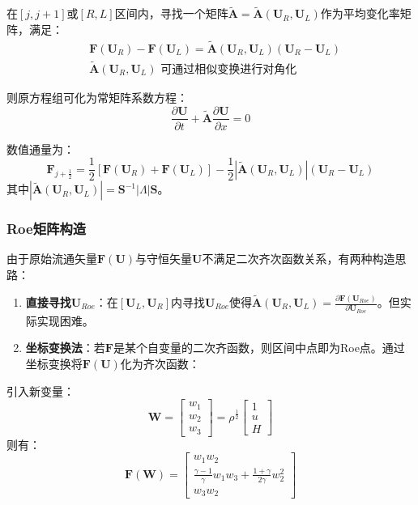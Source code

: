 \documentclass[12pt,a4paper]{article}
\begin{document}
在$[j,j+1]$或$[R,L]$区间内，寻找一个矩阵$\widetilde{\mathbf{A}} = \widetilde{\mathbf{A}}(\mathbf{U}_R, \mathbf{U}_L)$作为平均变化率矩阵，满足：
\begin{align*}
    &\mathbf{F}(\mathbf{U}_R) - \mathbf{F}(\mathbf{U}_L) = \widetilde{\mathbf{A}}(\mathbf{U}_R, \mathbf{U}_L)(\mathbf{U}_R - \mathbf{U}_L) \\
    &\widetilde{\mathbf{A}}(\mathbf{U}_R, \mathbf{U}_L) \text{ 可通过相似变换进行对角化}
\end{align*}

则原方程组可化为常矩阵系数方程：
$$
\frac{\partial \mathbf{U}}{\partial t} + \widetilde{\mathbf{A}}\frac{\partial \mathbf{U}}{\partial x} = 0
$$

数值通量为：
$$
\mathbf{F}_{j+\frac{1}{2}} = \frac{1}{2}\left[\mathbf{F}(\mathbf{U}_R) + \mathbf{F}(\mathbf{U}_L)\right] - \frac{1}{2}\left|\widetilde{\mathbf{A}}(\mathbf{U}_R, \mathbf{U}_L)\right|(\mathbf{U}_R - \mathbf{U}_L)
$$
其中$\left|\widetilde{\mathbf{A}}(\mathbf{U}_R, \mathbf{U}_L)\right| = \mathbf{S}^{-1}|\Lambda|\mathbf{S}$。

\subsubsection{Roe矩阵构造}
由于原始流通矢量$\mathbf{F}(\mathbf{U})$与守恒矢量$\mathbf{U}$不满足二次齐次函数关系，有两种构造思路：
\begin{enumerate}
    \item \textbf{直接寻找$\mathbf{U}_{Roe}$}：在$[\mathbf{U}_L, \mathbf{U}_R]$内寻找$\mathbf{U}_{Roe}$使得$\widetilde{\mathbf{A}}(\mathbf{U}_R, \mathbf{U}_L) = \frac{\partial \mathbf{F}(\mathbf{U}_{Roe})}{\partial \mathbf{U}_{Roe}}$。但实际实现困难。
    
    \item \textbf{坐标变换法}：若$\mathbf{F}$是某个自变量的二次齐函数，则区间中点即为Roe点。通过坐标变换将$\mathbf{F}(\mathbf{U})$化为齐次函数：
\end{enumerate}

引入新变量：
$$
\mathbf{W} = \begin{bmatrix} w_1 \\ w_2 \\ w_3 \end{bmatrix} = \rho^{\frac{1}{2}} \begin{bmatrix} 1 \\ u \\ H \end{bmatrix}
$$
则有：
$$
\mathbf{F}(\mathbf{W}) = \begin{bmatrix}
w_1 w_2 \\
\frac{\gamma-1}{\gamma}w_1 w_3 + \frac{1+\gamma}{2\gamma}w_2^2 \\
w_3 w_2
\end{bmatrix}
$$
\end{document}
